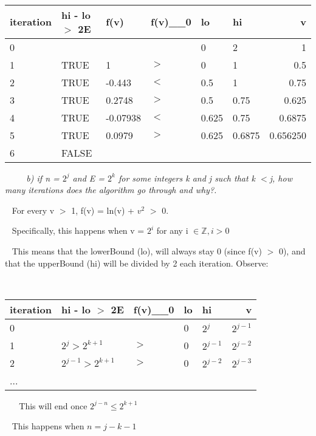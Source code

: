 \documentclass[12pt, letterpaper]{article}
\begin{document}
\-\ \newline
\begin{tabular}{ | l | l | l | l | l | l | r | }
    \hline			
    iteration & hi - lo \(>\) 2E & f(v) & f(v)\_\_0 & lo & hi & v \\
    \hline			
    0 & & & & 0 & 2 & 1 \\
    1 & TRUE & 1 & \(>\) & 0 & 1 & 0.5 \\
    2 & TRUE & -0.443 & \(<\) & 0.5 & 1 & 0.75 \\
    3 & TRUE & 0.2748 & \(>\) & 0.5 & 0.75 & 0.625 \\
    4 & TRUE & -0.07938 & \(<\) & 0.625 & 0.75 & 0.6875 \\
    5 & TRUE & 0.0979 & \(>\) & 0.625 & 0.6875 & 0.656250 \\
    6 & FALSE & & & & & \\
    \hline  
  \end{tabular}


\-\ \newline
\-\ \newline
\-\ \it{ b) if n = \(2^{j}\) and E = \(2^{k}\) for some integers k and j such that k \(<\)j, how many iterations
does the algorithm go through and why?.}
 
\-\ \newline
\textnormal{For every v \(>\) 1, f(v) = ln(v) + \(v^2\) \(>\) 0.}

\-\ \newline
\textnormal{Specifically, this happens when v = \(2^{i}\) for any i \(\in {\mathbb{Z}},  i > 0\)}

\-\ \newline
\textnormal{This means that the lowerBound (lo), will always stay 0 (since f(v) \(>\) 0), and that the upperBound (hi) will be divided by 2 each iteration. Observe:}


\-\ \newline
\begin{tabular}{ | l | l | l | l | l | r | }
    \hline			
    iteration & hi - lo \(>\) 2E & f(v)\_\_0 & lo & hi & v \\
    \hline			
    0 & & & 0 & \(2^{j}\) & \(2^{j - 1}\) \\
    1 & \( 2^j > 2^{k + 1} \) & \(>\) & 0 & \(2^{j - 1}\) & \(2^{j - 2}\) \\
    2 & \( 2^{j-1} > 2^{k + 1} \) & \(>\) & 0 & \(2^{j - 2}\) & \(2^{j - 3}\) \\
...
  \end{tabular}

\-\ \newline 
\-\ \newline 
\textnormal{This will end once \( 2^{j-n} \leq 2^{k + 1} \)}

\-\ \newline 
\textnormal{This happens when \( n = j - k - 1 \)}
\end{document}
